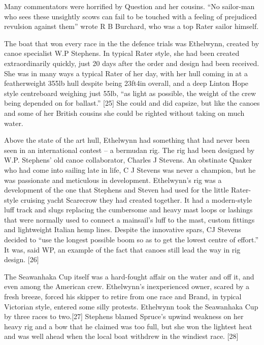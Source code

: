 \documentclass[
  letterpaper,
]{scrbook}
\begin{document}
Many commentators were horrified by Question and her cousins. ``No
sailor-man who sees these unsightly scows can fail to be touched with a
feeling of prejudiced revulsion against them'' wrote R B Burchard, who
was a top Rater sailor himself.

The boat that won every race in the the defence trials was Ethelwynn,
created by canoe specialist W.P Stephens. In typical Rater style, she
had been created extraordinarily quickly, just 20 days after the order
and design had been received. She was in many ways a typical Rater of
her day, with her hull coming in at a featherweight 355lb hull despite
being 23ft4in overall, and a deep Linton Hope style centreboard weighing
just 55lb, ``as light as possible, the weight of the crew being depended
on for ballast.'' {[}25{]} She could and did capsize, but like the
canoes and some of her British cousins she could be righted without
taking on much water.

Above the state of the art hull, Ethelwynn had something that had never
been seen in an international contest -- a bermudan rig. The rig had
been designed by W.P. Stephens' old canoe collaborator, Charles J
Stevens. An obstinate Quaker who had come into sailing late in life, C J
Stevens was never a champion, but he was passionate and meticulous in
development. Ethelwynn's rig was a development of the one that Stephens
and Steven had used for the little Rater-style cruising yacht Scarecrow
they had created together. It had a modern-style luff track and slugs
replacing the cumbersome and heavy mast loops or lashings that were
normally used to connect a mainsail's luff to the mast, custom fittings
and lightweight Italian hemp lines. Despite the innovative spars, CJ
Stevens decided to ``use the longest possible boom so as to get the
lowest centre of effort.'' It was, said WP, an example of the fact that
canoes still lead the way in rig design. {[}26{]}

The Seawanhaka Cup itself was a hard-fought affair on the water and off
it, and even among the American crew. Ethelwynn's inexperienced owner,
scared by a fresh breeze, forced his skipper to retire from one race and
Brand, in typical Victorian style, entered some silly protests.
Ethelwynn took the Seawanhaka Cup by three races to two.{[}27{]}
Stephens blamed Spruce's upwind weakness on her heavy rig and a bow that
he claimed was too full, but she won the lightest heat and was well
ahead when the local boat withdrew in the windiest race. {[}28{]}
\end{document}

